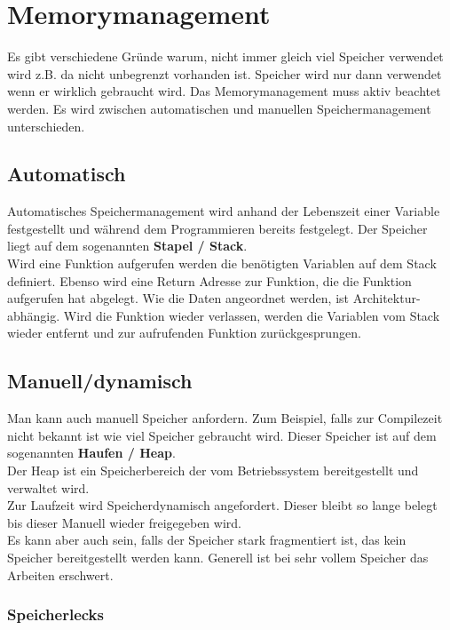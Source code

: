 \section{Memorymanagement}

Es gibt verschiedene Gründe warum, nicht immer gleich viel Speicher verwendet wird z.B. da nicht unbegrenzt vorhanden ist.
Speicher wird nur dann verwendet wenn er wirklich gebraucht wird. 
Das Memorymanagement muss aktiv beachtet werden.
Es wird zwischen automatischen und manuellen Speichermanagement unterschieden. 

\subsection{Automatisch}

Automatisches Speichermanagement wird anhand der Lebenszeit einer Variable festgestellt und während dem Programmieren bereits festgelegt. 
Der Speicher liegt auf dem sogenannten \textbf{Stapel / Stack}.\\
Wird eine Funktion aufgerufen werden die benötigten Variablen auf dem Stack definiert. 
Ebenso wird eine Return Adresse zur Funktion, die die Funktion aufgerufen hat abgelegt.
Wie die Daten angeordnet werden, ist Architektur-abhängig.
Wird die Funktion wieder verlassen, werden die Variablen vom Stack wieder entfernt und zur aufrufenden Funktion zurückgesprungen.  

\subsection{Manuell/dynamisch}

Man kann auch manuell Speicher anfordern. 
Zum Beispiel, falls zur Compilezeit nicht bekannt ist wie viel Speicher gebraucht wird.
Dieser Speicher ist auf dem sogenannten \textbf{Haufen / Heap}.\\
Der Heap ist ein Speicherbereich der vom Betriebssystem bereitgestellt und verwaltet wird.\\
Zur Laufzeit wird Speicherdynamisch angefordert. 
Dieser bleibt so lange belegt bis dieser Manuell wieder freigegeben wird.\\
Es kann aber auch sein, falls der Speicher stark fragmentiert ist, das kein Speicher bereitgestellt werden kann. 
Generell ist bei sehr vollem Speicher das Arbeiten erschwert.

\subsubsection{Speicherlecks}

